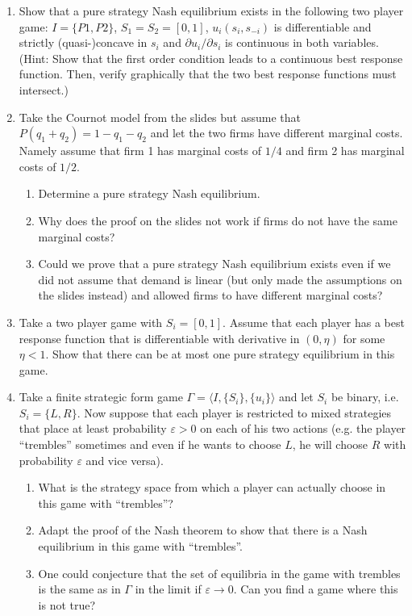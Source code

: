\documentclass[a4paper,12pt]{article}
\begin{document}
\begin{enumerate}
\item Show that a pure strategy Nash equilibrium exists in the following two player game: $I=\{P1,P2\}$, $S_1=S_2=[0,1]$, $u_i(s_i,s_{-i})$ is differentiable and strictly (quasi-)concave in $s_i$ and $\partial u_i/\partial s_i$ is continuous in both variables.\\
  (Hint: Show that the first order condition leads to a continuous best response function. Then, verify graphically that the two best response functions must intersect.)
\item Take the Cournot model from the slides but assume that $P(q_1+q_2)=1-q_1-q_2$ and let the two firms have different marginal costs. Namely assume that firm 1 has marginal costs of $1/4$ and firm 2 has marginal costs of $1/2$.
  \begin{enumerate}
  \item Determine a pure strategy Nash equilibrium.
  \item Why does the proof on the slides not work if firms do not have the same marginal costs?
    \item Could we prove that a pure strategy Nash equilibrium exists even if we did not assume that demand is linear (but only made the assumptions on the slides instead) and allowed firms to have different marginal costs?
  \end{enumerate}
\item Take a two player game with $S_i=[0,1]$. Assume that each player has a best response function that is differentiable with derivative in $(0,\eta)$ for some $\eta<1$. Show that there can be at most one pure strategy equilibrium in this game.
\item Take a finite strategic form game $\Gamma=\langle I,\{S_i\},\{u_i\} \rangle$ and let $S_i$ be binary, i.e. $S_i=\{L,R\}$. Now suppose that each player is restricted to mixed strategies that place at least probability $\varepsilon >0$ on each of his two actions (e.g. the player ``trembles'' sometimes and even if he wants to choose $L$, he will choose $R$ with probability $\varepsilon $ and vice versa).
  \begin{enumerate}
  \item What is the strategy space from which a player can actually
    choose in this game with ``trembles''?
  \item Adapt the proof of the Nash theorem to show that there is a Nash equilibrium in this game  with ``trembles''.
    \item One could conjecture that the set of equilibria in the game with trembles is the same as in $\Gamma$ in the limit if $\varepsilon \rightarrow 0$. Can you find a game where this is not true?
\end{enumerate}
\end{enumerate}
\end{document}
